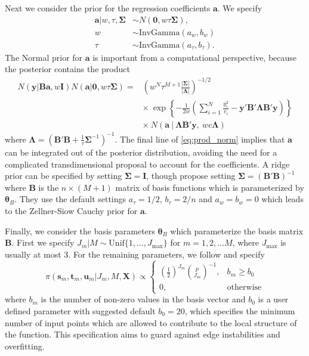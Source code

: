 \documentclass{article} %
\begin{document}
Next we consider the prior for the regression coefficients $\bm a$. We specify
\begin{align*}
\bm a|w, \tau, \bm\Sigma &\sim N(\bm 0, w\tau\bm \Sigma), \\
    w &\sim \text{InvGamma}(a_w, b_w) \\
    \tau &\sim \text{InvGamma}(a_\tau, b_\tau).
\end{align*}
The Normal prior for $\bm a$ is important from a computational perspective, because the posterior contains the product
\begin{equation}\label{eq:prod_norm}
\begin{aligned}
N(\bm y | \bm B \bm a, w\bm I)N(\bm a | \bm 0, w\tau\bm\Sigma) = 
&\left(w^N\tau^{M+1}\frac{|\bm\Sigma|}{|\bm\Lambda|}\right)^{-1/2} \\
& \times  \ \exp\left\{-\frac{1}{2w}\left(\sum_{i=1}^N\frac{y_i^2}{v_i} - \bm y' \bm B'\bm\Lambda\bm B'\bm y\right) \right\} \\
&\times \ N\left(\bm a \ \bigg| \ \bm\Lambda\bm B'\bm y, \ wc\bm\Lambda\right)
\end{aligned}
\end{equation}
where $\bm\Lambda = \left(\bm B'\bm B + \frac{1}{\tau}\bm\Sigma^{-1}\right)^{-1}$.
The final line of \cref{eq:prod_norm} implies that $\bm a$ can be integrated out of the posterior distribution, avoiding the need for a complicated transdimensional proposal to account for the coefficients.
A ridge prior can be specified by setting $\bm\Sigma = \bm I$, though \cite{francom2020} propose setting $\bm\Sigma = (\bm B'\bm B)^{-1}$ where $\bm B$ is the $n\times (M+1)$ matrix of basis functions which is parameterized by $\bm \theta_B$. They use the default settings $a_\tau = 1/2$, $b_\tau=2/n$ and $a_w = b_w = 0$ which leads to the Zellner-Siow Cauchy prior for $\bm a$. 

Finally, we consider the basis parameters $\bm\theta_B$ which parameterize the basis matrix $\bm B$. First we specify $J_m|M \sim \text{Unif}\{1,\ldots, J_\text{max}\}$ for $m=1,2,\ldots M$, where $J_\text{max}$ is usually at most $3$. For the remaining parameters, we follow \cite{francom2018} and specify 
\begin{equation}
\label{eq:pitheta}
\pi(\bm s_m, \bm t_m, \bm u_m|J_m, M, \bm X) \propto \begin{cases}
\left(\frac{1}{2}\right)^{J_m}\binom{p}{J_m}^{-1}, & b_m \geq b_0 \\
0, & \text{otherwise}
\end{cases}
\end{equation}
where $b_m$ is the number of non-zero values in the basis vector and $b_0$ is a user defined parameter with suggested default $b_0 = 20$, which specifies the minimum number of input points which are allowed to contribute to the local structure of the function. This specification aims to guard against edge instabilities and overfitting.  
\end{document}
